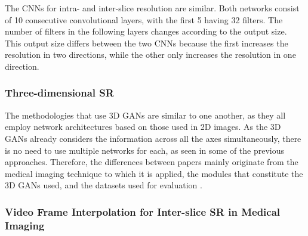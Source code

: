 \par
The CNNs for intra- and inter-slice resolution are similar. Both networks consist of 10 consecutive convolutional layers, with the first 5 having 32 filters. The number of filters in the following layers changes according to the output size. This output size differs between the two CNNs because the first increases the resolution in two directions, while the other only increases the resolution in one direction.

\subsubsection{Three-dimensional SR}

The methodologies that use 3D GANs are similar to one another, as they all employ network architectures based on those used in 2D images. As the 3D GANs already considers the information across all the axes simultaneously, there is no need to use multiple networks for each, as seen in some of the previous approaches. Therefore, the differences between papers mainly originate from the medical imaging technique to which it is applied, the modules that constitute the 3D GANs used, and the datasets used for evaluation \parencite{YChen2018, Sanchez2018, Kudo2019, Zhang2022}.

\subsubsection{Video Frame Interpolation for Inter-slice SR in Medical Imaging}

